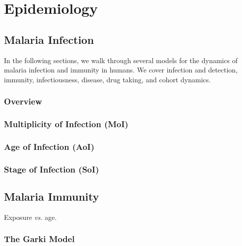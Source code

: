 \documentclass[
]{book}
\begin{document}
\hypertarget{part-epidemiology}{%
\part{Epidemiology}\label{part-epidemiology}}

\hypertarget{malaria-infection}{%
\chapter{Malaria Infection}\label{malaria-infection}}

In the following sections, we walk through several models for the dynamics of malaria infection and immunity in humans. We cover infection and detection, immunity, infectiousness, disease, drug taking, and cohort dynamics.

\hypertarget{overview-1}{%
\section{Overview}\label{overview-1}}

\hypertarget{multiplicity-of-infection-moi}{%
\section{Multiplicity of Infection (MoI)}\label{multiplicity-of-infection-moi}}

\hypertarget{age-of-infection-aoi}{%
\section{Age of Infection (AoI)}\label{age-of-infection-aoi}}

\hypertarget{stage-of-infection-soi}{%
\section{Stage of Infection (SoI)}\label{stage-of-infection-soi}}

\hypertarget{malaria-immunity}{%
\chapter{Malaria Immunity}\label{malaria-immunity}}

Exposure \emph{vs.} age.

\hypertarget{the-garki-model}{%
\section{The Garki Model}\label{the-garki-model}}
\end{document}
